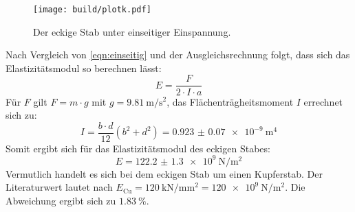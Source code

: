 \begin{figure}
  \centering
  \caption{Der eckige Stab unter einseitiger Einspannung.}
  \texttt{[image: build/plotk.pdf]}
  \label{fig:eckig}
\end{figure}
Nach Vergleich von \eqref{eqn:einseitig}
und der Ausgleichsrechnung folgt, dass sich das Elastizitätsmodul so berechnen lässt:
\begin{equation*}
  E = \frac{F}{2 \cdot I \cdot a} 
\end{equation*}
Für $F$ gilt $F = m \cdot g$ mit $g=\SI{9.81}{\metre\per\second\squared}$, das Flächenträgheitsmoment $I$ errechnet sich zu:
\begin{equation*}
  I = \frac{b\cdot d}{12} (b^2 + d^2) = \SI{0.923(70)e-9}{\metre\tothe{4}}
\end{equation*}
Somit ergibt sich für das Elastizitätsmodul des eckigen Stabes:
\begin{equation*}
  E = \SI{122.2(13)e9}{\newton\per\metre\squared}
\end{equation*}
Vermutlich handelt es sich bei dem eckigen Stab um einen Kupferstab. Der Literaturwert lautet nach \cite{chemie.de}
$E_{\text{Cu}} = \SI{120}{\kilo\newton\per\milli\metre\squared} = \SI{120e9}{\newton\per\metre\squared}$. 
Die Abweichung ergibt sich zu $\SI{1.83}{\percent}$.  


